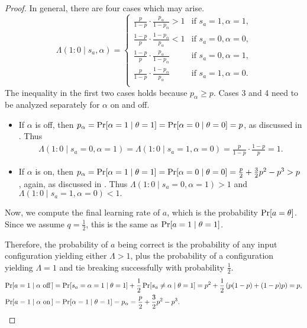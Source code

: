 \begin{proof}
    In general, there are four cases which may arise.
    \[
                \Lambda(1:0 \mid s_a, \alpha) = \begin{cases}
                     \frac p{1-p} \cdot \frac {p_\alpha}{1-p_\alpha} > 1 & \text{if $s_a = 1, \alpha = 1$,} \\
                     \frac {1-p}p \cdot \frac {1-{p_\alpha}}{p_\alpha} < 1 & \text{if $s_a = 0, \alpha = 0$,} \\
                     \frac {1-p}p\cdot \frac{p_\alpha}{1-p_\alpha} & \text{if $s_a = 0, \alpha = 1$,} \\
                     \frac p{1-p} \cdot\frac{1-p_\alpha}{p_\alpha} & \text{if $s_a = 1, \alpha = 0$.} \\
                \end{cases}
    \]
    The inequality in the first two cases holds because $ p_\alpha \geq p $.
    Cases 3 and 4 need to be analyzed separately for $ \alpha $ on and off.
    \begin{itemize}
        \item If $\alpha$ is off, then $ p_\alpha = \Pr\!\left[ \alpha = 1 \mid  \theta = 1 \right] = \Pr\!\left[ \alpha = 0 \mid \theta = 0 \right] = p $, as discussed in .
            Thus \begin{align*}
                \Lambda(1:0 \mid s_a = 0, \alpha=1) = 
                \Lambda(1:0 \mid s_a = 1, \alpha=0)                 = \frac p{1-p} \cdot\frac{1-p}{p} = 1.
            \end{align*}
        \item If $\alpha$ is on, then $ p_\alpha = \Pr\!\left[ \alpha = 1 \mid  \theta = 1 \right] = \Pr\!\left[ \alpha = 0 \mid \theta = 0 \right] = \frac p2 + \frac 32 p^2 - p^3 > p $, again, as discussed in .
            Thus $\Lambda(1:0 \mid s_a = 0, \alpha=1) > 1$ and $\Lambda(1:0 \mid s_a = 1, \alpha=0) < 1.$ \end{itemize}
    
            Now, we compute the final learning rate of $ a $, which is the probability $ \Pr\!\left[ a=\theta \right] $. Since we assume $ q = \frac 12 $, this is the same as $ \Pr\!\left[ a=1 \;\vert\; \theta=1 \right] $.
    
	Therefore, the probability of $a$ being correct is the probability of any input configuration yielding either $\Lambda > 1$, plus the probability of a configuration yielding $\Lambda = 1$ and tie breaking successfully with probability $ \frac 12 $.
    \begin{align*}
        \Pr[a = 1 \mid \alpha \text{ off}\,] &= \Pr[s_a = \alpha = 1 \mid \theta = 1] + \frac 12 \Pr\!\left[ s_a \neq \alpha \mid \theta = 1 \right] = p^2 + \frac 12 \left( p(1-p) + (1-p)p \right) = p, \\
            \Pr[a = 1 \mid \alpha \text{ on}\,] &= \Pr[\alpha = 1 \mid \theta = 1] = p_\alpha = \frac p2 + \frac 32 p^2 - p^3.
	\end{align*}
\end{proof}

